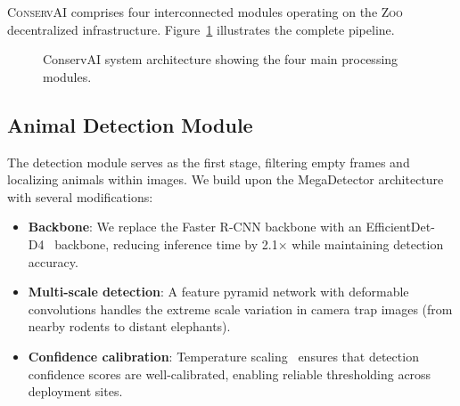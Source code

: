 \documentclass[11pt,letterpaper]{article}
\newcommand{\Zoo}{\textsc{Zoo}}
\newcommand{\ConservAI}{\textsc{ConservAI}}
\begin{document}
\ConservAI{} comprises four interconnected modules operating on the \Zoo{} decentralized infrastructure. Figure~\ref{fig:architecture} illustrates the complete pipeline.

\begin{figure}[htbp]
\centering
{}
\caption{ConservAI system architecture showing the four main processing modules.}
\label{fig:architecture}
\end{figure}

\subsection{Animal Detection Module}

The detection module serves as the first stage, filtering empty frames and localizing animals within images. We build upon the MegaDetector architecture~\cite{beery2019mega} with several modifications:

\begin{itemize}[leftmargin=*]
    \item \textbf{Backbone}: We replace the Faster R-CNN backbone with an EfficientDet-D4~\cite{tan2020} backbone, reducing inference time by 2.1$\times$ while maintaining detection accuracy.
    \item \textbf{Multi-scale detection}: A feature pyramid network with deformable convolutions handles the extreme scale variation in camera trap images (from nearby rodents to distant elephants).
    \item \textbf{Confidence calibration}: Temperature scaling~\cite{guo2017} ensures that detection confidence scores are well-calibrated, enabling reliable thresholding across deployment sites.
\end{itemize}
\end{document}
